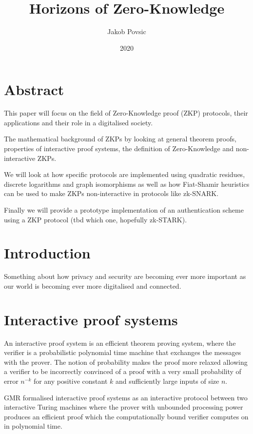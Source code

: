 \documentclass[12pt,a4paper]{article}
\title{Horizons of Zero-Knowledge}
\author{Jakob Povsic}
\date{2020}
\begin{document}

\maketitle
\newpage

\tableofcontents
\newpage

\section*{Abstract}
This paper will focus on the field of Zero-Knowledge proof (ZKP) protocols, their applications and their role in a digitalised society.

The mathematical background of ZKPs by looking at general theorem proofs, properties of interactive proof systems, the definition of Zero-Knowledge and non-interactive ZKPs.

We will look at how specific protocols are implemented using quadratic residues, discrete logarithms and graph isomorphisms as well as how Fiat-Shamir heuristics can be used to make ZKPs non-interactive in protocols like zk-SNARK.

Finally we will provide a prototype implementation of an authentication scheme using a ZKP protocol (tbd which one, hopefully zk-STARK).
\newpage

\section{Introduction}
Something about how privacy and security are becoming ever more important as our world is becoming ever more digitalised and connected.

\section{Interactive proof systems}
An interactive proof system is an efficient theorem proving system, where the verifier is a probabilistic polynomial time machine that exchanges the messages with the prover. The notion of probability makes the proof more relaxed allowing a verifier to be incorrectly convinced of a proof with a very small probability of error $n^{-k}$ for any positive constant $k$ and sufficiently large inputs of size $n$.

GMR \cite{10.1145/22145.22178} formalised interactive proof systems as an interactive protocol between two interactive Turing machines where the prover with unbounded processing power produces an efficient proof which the computationally bound verifier computes on in polynomial time.
\end{document}
